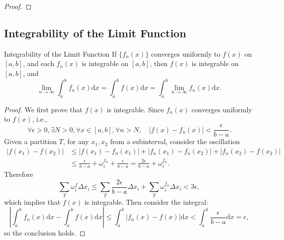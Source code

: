 \begin{proof}
  
\end{proof}

\subsection{Integrability of the Limit Function}

\begin{theorem}{Integrability of the Limit Function}{}
  If $\{f_n(x)\}$ converges uniformly to $f(x)$ on $[a, b]$,
  and each $f_n(x)$ is integrable on $[a, b]$,
  then $f(x)$ is integrable on $[a, b]$, and
  \begin{equation}
    \lim \limits _{n \rightarrow \infty} \int_a^b f_n(x) \mathrm{d} x 
    = \int_a^b f(x)\mathrm{d} x = \int_a^b \lim \limits _{n \rightarrow \infty} f_n(x) \mathrm{d} x.
  \end{equation}
\end{theorem}

\begin{proof}
  We first prove that $f(x)$ is integrable.
  Since $f_n(x)$ converges uniformly to $f(x)$, i.e.,
  \begin{equation}
    \forall \epsilon > 0, \exists N > 0, \forall x \in [a, b], \forall n > N, \quad
    |f(x) - f_n(x)| < \frac{\epsilon}{b - a}.
  \end{equation}
  Given a partition $T$, for any $x_1, x_2$ from a subinterval, consider the
  oscillation
  \begin{align}
    |f(x_1) - f(x_2)| &\leq |f(x_1) - f_n(x_1)| + |f_n(x_1) - f_n(x_2)| + |f_n(x_2) - f(x_2)|\\
    &\leq \frac{\epsilon}{b - a} + \omega_i^{f_n} + \frac{\epsilon}{b-a} = \frac{2\epsilon}{b-a} + \omega_i^{f_n}.
  \end{align}
  Therefore
  \begin{equation}
    \sum \limits_T \omega_i^f \Delta x_i \leq \sum \limits_T \frac{2\epsilon}{b-a}\Delta x_i
    + \sum \limits_T \omega_i^{f_n}\Delta x_i < 3\epsilon,
  \end{equation}
  which implies that $f(x)$ is integrable. Then consider the integral:
  \begin{equation}
    \left| \int_a^b f_n(x) \mathrm{d} x - \int_a^b f(x)\mathrm{d} x \right|
    \leq \int_a^b \left| f_n(x) - f(x) \right|\mathrm{d} x
    < \int_a^b \frac{\epsilon}{b-a}\mathrm{d} x = \epsilon,
  \end{equation}
  so the conclusion holds.
\end{proof}


